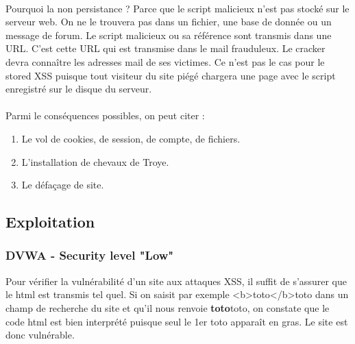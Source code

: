 \paragraph{} Pourquoi la non persistance ? Parce que le script malicieux n'est pas stocké sur le serveur web. On ne le trouvera pas dans un fichier, une base de donnée ou un message de forum. Le script malicieux ou sa référence sont transmis dans une URL. C'est cette URL qui est transmise dans le mail frauduleux. Le cracker devra connaître les adresses mail de ses victimes. Ce n'est pas le cas pour le stored XSS puisque tout visiteur du site piégé chargera une page avec le script enregistré sur le disque du serveur. 



\paragraph{} Parmi le conséquences possibles, on peut citer :
 

\begin{enumerate}
	\item Le vol de cookies, de session, de compte, de fichiers. 
	\item L'installation de chevaux de Troye.
	\item Le défaçage de site.
\end{enumerate}



\subsection{Exploitation}

\subsubsection{DVWA - Security level "Low"}

Pour vérifier la vulnérabilité d'un site aux attaques XSS, il suffit de s'assurer que le html est transmis tel quel. Si on saisit par exemple <b>toto</b>toto dans un champ de recherche du site et qu'il nous renvoie \textbf{toto}toto, on constate que le code html est bien interprété puisque seul le 1er toto apparaît en gras.  Le site est donc vulnérable. 



